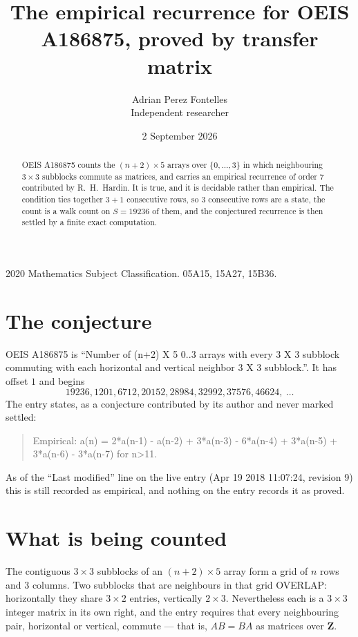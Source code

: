 \documentclass[11pt,a4paper]{article}
\title{The empirical recurrence for OEIS A186875, proved by transfer matrix}
\author{Adrian Perez Fontelles\\ \small Independent researcher}
\date{2 September 2026}
\theoremstyle{plain}
\theoremstyle{definition}
\begin{document}
\maketitle

\begin{abstract}
OEIS A186875 counts the $(n+2)\times5$ arrays over $\{0,\dots,3\}$ in which
neighbouring $3\times3$ subblocks commute as matrices, and carries an empirical
recurrence
of order $7$ contributed by R.~H.~Hardin. It is true, and it is decidable rather than
empirical. The condition ties together $3+1$ consecutive rows, so $3$ consecutive rows are
a state, the count is a walk count on $S=19236$ of them, and the conjectured recurrence is then
settled by a finite exact computation.
\end{abstract}

\noindent\small 2020 Mathematics Subject Classification. 05A15, 15A27, 15B36.\normalsize

\section{The conjecture}

OEIS A186875 is ``Number of (n+2) X 5 0..3 arrays with every 3 X 3 subblock commuting with each horizontal and vertical neighbor 3 X 3 subblock.''. It has offset $1$ and begins
\[
19236, 1201, 6712, 20152, 28984, 32992, 37576, 46624,\ \dots
\]
The entry states, as a conjecture contributed by its author and never marked settled:
\begin{quote}
Empirical: a(n) = 2*a(n-1) - a(n-2) + 3*a(n-3) - 6*a(n-4) + 3*a(n-5) + 3*a(n-6) - 3*a(n-7) for n>11.
\end{quote}
As of the ``Last modified'' line on the live entry (Apr 19 2018 11:07:24, revision 9) this is still
recorded as empirical, and nothing on the entry records it as proved.

\section{What is being counted}

The contiguous $3\times3$ subblocks of an $(n+2)\times5$ array form a grid of $n$
rows and $3$ columns. Two subblocks that are neighbours in that
grid OVERLAP: horizontally they share $3\times2$ entries, vertically
$2\times3$. Nevertheless each is a $3\times3$ integer matrix in its own right, and
the entry requires that every neighbouring pair, horizontal or vertical, commute --- that is,
$AB=BA$ as matrices over $\mathbf{Z}$.
\end{document}
